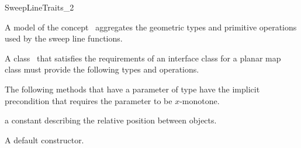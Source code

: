 

\begin{ccRefConcept}{SweepLineTraits_2}


\ccDefinition
  
A model of the concept \ccRefName\ aggregates the geometric types and
primitive operations used by the sweep line functions.


\ccTypes

  A class \ccClassTemplateName\ that satisfies the requirements of an
  interface class for a planar map class must provide the following types
  and operations. 

  
  The following methods that have a parameter of type  have the
  implicit precondition that requires the parameter to be $x$-monotone.


  {a constant describing the relative position between objects.}

\ccCreation
    

  {A default constructor.}



\end{ccRefConcept}
